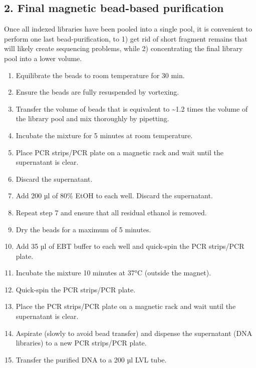 \documentclass[
]{book}
\providecommand{\tightlist}{%
  \setlength{\itemsep}{0pt}\setlength{\parskip}{0pt}}
\begin{document}
\hypertarget{final-magnetic-bead-based-purification}{%
\subsection*{2. Final magnetic bead-based purification}\label{final-magnetic-bead-based-purification}}

Once all indexed libraries have been pooled into a single pool, it is convenient to perform one last bead-purification, to 1) get rid of short fragment remains that will likely create sequencing problems, while 2) concentrating the final library pool into a lower volume.

\begin{enumerate}
\def\labelenumi{\arabic{enumi}.}
\tightlist
\item
  Equilibrate the beads to room temperature for 30 min.
\item
  Ensure the beads are fully resuspended by vortexing.
\item
  Transfer the volume of beads that is equivalent to \textasciitilde1.2 times the volume of the library pool and mix thoroughly by pipetting.
\item
  Incubate the mixture for 5 minutes at room temperature.
\item
  Place PCR strips/PCR plate on a magnetic rack and wait until the supernatant is clear.
\item
  Discard the supernatant.
\item
  Add 200 µl of 80\% EtOH to each well. Discard the supernatant.
\item
  Repeat step 7 and ensure that all residual ethanol is removed.
\item
  Dry the beads for a maximum of 5 minutes.
\item
  Add 35 µl of EBT buffer to each well and quick-spin the PCR strips/PCR plate.
\item
  Incubate the mixture 10 minutes at 37°C (outside the magnet).
\item
  Quick-spin the PCR strips/PCR plate.
\item
  Place the PCR strips/PCR plate on a magnetic rack and wait until the supernatant is clear.
\item
  Aspirate (slowly to avoid bead transfer) and dispense the supernatant (DNA libraries) to a new PCR strips/PCR plate.
\item
  Transfer the purified DNA to a 200 µl LVL tube.
\end{enumerate}

  
\end{document}
